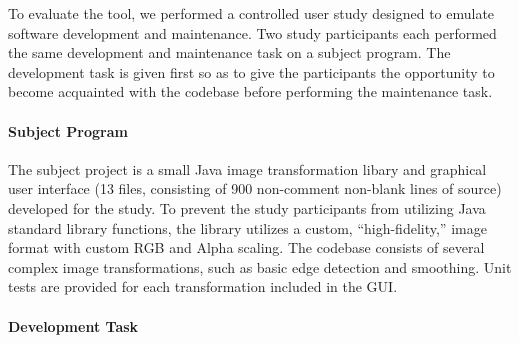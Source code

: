 \documentclass[nocopyrightspace,10pt]{sigplanconf}
\begin{document}
To evaluate the tool, we performed a controlled user study designed to
emulate software development and maintenance.  Two study participants
each performed the same development and maintenance task on a subject
program. The development task is given first so as to give the
participants the opportunity to become acquainted with the codebase
before performing the maintenance task.

\paragraph{Subject Program}
The subject project is a small Java image transformation libary and
graphical user interface (13 files, consisting of 900 non-comment
non-blank lines of source) developed for the study. To prevent the
study participants from utilizing Java standard library functions, the
library utilizes a custom, ``high-fidelity,'' image format with custom
RGB and Alpha scaling. The codebase consists of several complex image
transformations, such as basic edge detection and smoothing. Unit tests
are provided for each transformation included in the GUI.



\paragraph{Development Task}
\end{document}
